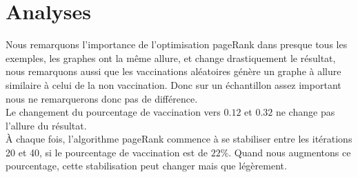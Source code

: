 \documentclass{report}
\begin{document}
\section{Analyses}
Nous remarquons l'importance de l'optimisation pageRank dans presque tous les exemples, les graphes
ont la même allure, et change drastiquement le résultat, nous remarquons aussi que les vaccinations
aléatoires génère un graphe à allure similaire à celui de la non vaccination. Donc sur un échantillon
assez important nous ne remarquerons donc pas de différence.\\
Le changement du pourcentage de vaccination vers $0.12$ et $0.32$ ne change pas l'allure du résultat.\\
À chaque fois, l'algorithme pageRank commence à se stabiliser entre les itérations 20 et 40, si
le pourcentage de vaccination est de $22\%$. Quand nous augmentons ce pourcentage, cette stabilisation
peut changer mais que légèrement.
{}

\end{document}
